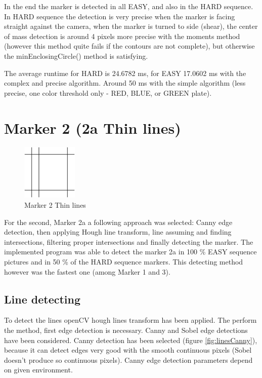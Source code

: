 In the end the marker is detected in all EASY, and also in the HARD sequence. In HARD sequence the detection is very precise when
the marker is facing straight against the camera, when the marker is turned to side (shear), the center of mass detection is around 4 pixels more precise with the moments method (however this method quite fails if the contours are not complete), but otherwise the minEnclosingCircle() method is satisfying. 

The average runtime for HARD is 24.6782 ms, for EASY 17.0602 ms with the complex and precise algorithm. Around 50 ms with the simple algorithm (less precise, one color threshold only - RED, BLUE, or GREEN plate).


\newpage
\section{Marker 2 (2a Thin lines)}

\begin{figure}[ht!]
	\centering
	\includegraphics[width=100px]{figures/Marker2a}
	\caption{Marker 2 Thin lines}
	\label{fig:markerLines}
\end{figure}

For the second, Marker 2a a following approach was selected: Canny edge detection, then applying Hough line transform,
line assuming and finding intersections, filtering proper intersections and finally detecting the marker. The implemented 
program was able to detect the marker 2a in 100 \% EASY sequence pictures and in 50 \% of the HARD sequence markers. This 
detecting method however was the fastest one (among Marker 1 and 3).

\subsection{Line detecting}
To detect the lines openCV hough lines transform has been applied. The perform the method, first edge detection is necessary.
Canny and Sobel edge detections have been considered. Canny detection has been selected (figure \ref{fig:linesCanny}), because it can detect edges very good with the smooth continuous pixels (Sobel doesn't produce so continuous pixels). Canny edge detection parameters depend on given environment. 

